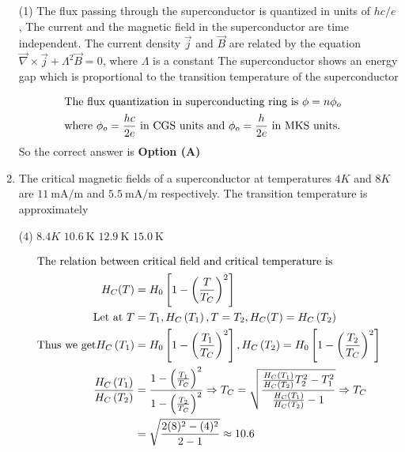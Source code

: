 \begin{enumerate}
	{}
	\begin{tasks}(1)
		\task[\textbf{A.}] The flux passing through the superconductor is quantized in units of $h c / e$,
		\task[\textbf{B.}] The current and the magnetic field in the superconductor are time independent.
		\task[\textbf{C.}] The current density $\vec{j}$ and $\vec{B}$ are related by the equation $\vec{\nabla} \times \vec{j}+\Lambda^{2} \vec{B}=0$, where $\Lambda$ is a constant
		\task[\textbf{D.}] The superconductor shows an energy gap which is proportional to the transition temperature of the superconductor
	\end{tasks}
	\begin{answer}
		\begin{align*}
		\intertext{The flux quantization in superconducting ring is $\phi=n \phi_{o}$}
		\text{where }\phi_{o}&=\frac{h c}{2 e}\text{ in CGS units and }\phi_{o}=\frac{h}{2 e}\text{ in MKS units.}
		\end{align*}
		So the correct answer is \textbf{Option (A)}
	\end{answer}
	\item The critical magnetic fields of a superconductor at temperatures $4 K$ and $8 K$ are $11 \mathrm{~mA} / \mathrm{m}$ and $5.5 \mathrm{~mA} / \mathrm{m}$ respectively. The transition temperature is approximately
	{}
	\begin{tasks}(4)
		\task[\textbf{A.}] $8.4 K$
		\task[\textbf{B.}] $10.6 \mathrm{~K}$
		\task[\textbf{C.}] $12.9 \mathrm{~K}$
		\task[\textbf{D.}] $15.0 \mathrm{~K}$
	\end{tasks}
	\begin{answer}
		\begin{align*}
		\intertext{The relation between critical field and critical temperature is}
		H_{C}(T)&=H_{0}\left[1-\left(\frac{T}{T_{C}}\right)^{2}\right]\\
		\text{Let at }T&=T_{1}, H_{C}\left(T_{1}\right), T=T_{2}, H_{C}(T)=H_{C}\left(T_{2}\right)\\
		\text{Thus we get} H_{C}\left(T_{1}\right)&=H_{0}\left[1-\left(\frac{T_{1}}{T_{C}}\right)^{2}\right], H_{C}\left(T_{2}\right)=H_{0}\left[1-\left(\frac{T_{2}}{T_{C}}\right)^{2}\right]\\
		\frac{H_{C}\left(T_{1}\right)}{H_{C}\left(T_{2}\right)}&=\frac{1-\left(\frac{T_{1}}{T_{C}}\right)^{2}}{1-\left(\frac{T_{2}}{T_{C}}\right)^{2}} \Rightarrow T_{C}=\sqrt{\frac{\frac{H_{C}\left(T_{1}\right)}{H_{C}\left(T_{2}\right)} T_{2}^{2}-T_{1}^{2}}{\frac{H_{C}\left(T_{1}\right)}{H_{C}\left(T_{2}\right)}-1}} \Rightarrow T_{C}\\&=\sqrt{\frac{2(8)^{2}-(4)^{2}}{2-1}} \approx 10.6

\end{align*}
\end{answer}
\end{enumerate}
